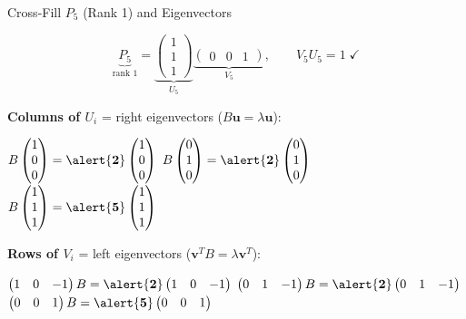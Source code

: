 \documentclass[10pt]{beamer}
\theoremstyle{definition}
\newcommand{\x}[1]{\alert{\textbf{#1}}}
\begin{document}
\begin{frame}[shrink=5]{Cross-Fill $P_5$ (Rank 1) and Eigenvectors}

$$\underbrace{P_5}_{\text{rank }1} = \underbrace{\begin{pmatrix}1\\1\\1\end{pmatrix}}_{U_5}\underbrace{\begin{pmatrix}0&0&1\end{pmatrix}}_{V_5}, \qquad V_5 U_5 = 1 \;\checkmark$$

\vfill\pause

\x{Columns of $U_i$} = right eigenvectors ($B\mathbf{u} = \lambda\mathbf{u}$):

\smallskip

$B\begin{pmatrix}1\\0\\0\end{pmatrix} = \x{2}\begin{pmatrix}1\\0\\0\end{pmatrix}$ \;\checkmark \quad
$B\begin{pmatrix}0\\1\\0\end{pmatrix} = \x{2}\begin{pmatrix}0\\1\\0\end{pmatrix}$ \;\checkmark \quad
$B\begin{pmatrix}1\\1\\1\end{pmatrix} = \x{5}\begin{pmatrix}1\\1\\1\end{pmatrix}$ \;\checkmark

\vfill\pause

\x{Rows of $V_i$} = left eigenvectors ($\mathbf{v}^T B = \lambda\mathbf{v}^T$):

\smallskip

$\begin{pmatrix}1&0&-1\end{pmatrix}B = \x{2}\begin{pmatrix}1&0&-1\end{pmatrix}$ \;\checkmark \quad
$\begin{pmatrix}0&1&-1\end{pmatrix}B = \x{2}\begin{pmatrix}0&1&-1\end{pmatrix}$ \;\checkmark \quad
$\begin{pmatrix}0&0&1\end{pmatrix}B = \x{5}\begin{pmatrix}0&0&1\end{pmatrix}$ \;\checkmark

\end{frame}
\end{document}
